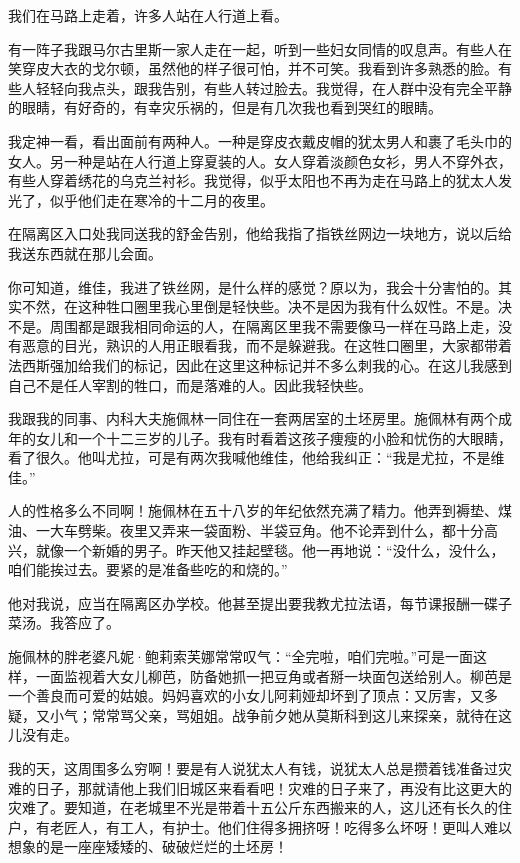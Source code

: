 我们在马路上走着，许多人站在人行道上看。

有一阵子我跟马尔古里斯一家人走在一起，听到一些妇女同情的叹息声。有些人在笑穿皮大衣的戈尔顿，虽然他的样子很可怕，并不可笑。我看到许多熟悉的脸。有些人轻轻向我点头，跟我告别，有些人转过脸去。我觉得，在人群中没有完全平静的眼睛，有好奇的，有幸灾乐祸的，但是有几次我也看到哭红的眼睛。

我定神一看，看出面前有两种人。一种是穿皮衣戴皮帽的犹太男人和裹了毛头巾的女人。另一种是站在人行道上穿夏装的人。女人穿着淡颜色女衫，男人不穿外衣，有些人穿着绣花的乌克兰衬衫。我觉得，似乎太阳也不再为走在马路上的犹太人发光了，似乎他们走在寒冷的十二月的夜里。

在隔离区入口处我同送我的舒金告别，他给我指了指铁丝网边一块地方，说以后给我送东西就在那儿会面。

你可知道，维佳，我进了铁丝网，是什么样的感觉？原以为，我会十分害怕的。其实不然，在这种牲口圈里我心里倒是轻快些。决不是因为我有什么奴性。不是。决不是。周围都是跟我相同命运的人，在隔离区里我不需要像马一样在马路上走，没有恶意的目光，熟识的人用正眼看我，而不是躲避我。在这牲口圈里，大家都带着法西斯强加给我们的标记，因此在这里这种标记并不多么刺我的心。在这儿我感到自己不是任人宰割的牲口，而是落难的人。因此我轻快些。

我跟我的同事、内科大夫施佩林一同住在一套两居室的土坯房里。施佩林有两个成年的女儿和一个十二三岁的儿子。我有时看着这孩子痩瘦的小脸和忧伤的大眼睛，看了很久。他叫尤拉，可是有两次我喊他维佳，他给我纠正：“我是尤拉，不是维佳。”

人的性格多么不同啊！施佩林在五十八岁的年纪依然充满了精力。他弄到褥垫、煤油、一大车劈柴。夜里又弄来一袋面粉、半袋豆角。他不论弄到什么，都十分高兴，就像一个新婚的男子。昨天他又挂起壁毯。他一再地说：“没什么，没什么，咱们能挨过去。要紧的是准备些吃的和烧的。”

他对我说，应当在隔离区办学校。他甚至提出要我教尤拉法语，每节课报酬一碟子菜汤。我答应了。

施佩林的胖老婆凡妮·鲍莉索芙娜常常叹气：“全完啦，咱们完啦。”可是一面这样，一面监视着大女儿柳芭，防备她抓一把豆角或者掰一块面包送给别人。柳芭是一个善良而可爱的姑娘。妈妈喜欢的小女儿阿莉娅却坏到了顶点：又厉害，又多疑，又小气；常常骂父亲，骂姐姐。战争前夕她从莫斯科到这儿来探亲，就待在这儿没有走。

我的天，这周围多么穷啊！要是有人说犹太人有钱，说犹太人总是攒着钱准备过灾难的日子，那就请他上我们旧城区来看看吧！灾难的日子来了，再没有比这更大的灾难了。要知道，在老城里不光是带着十五公斤东西搬来的人，这儿还有长久的住户，有老匠人，有工人，有护士。他们住得多拥挤呀！吃得多么坏呀！更叫人难以想象的是一座座矮矮的、破破烂烂的土坯房！

